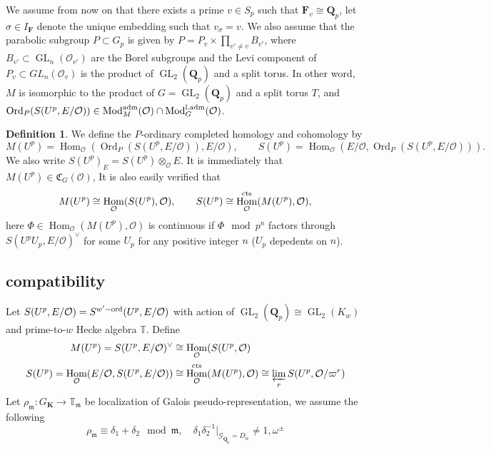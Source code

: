 \documentclass[leqno]{amsart}
\newcommand{\TT}{\mathbb{T}} %
\newcommand{\aMod}{\textnormal{Mod}^{\textnormal{adm}}}
\newcommand{\laMod}{\textnormal{Mod}^{\textnormal{l.adm}}}
\newcommand{\fC}{\mathfrak C}
\newcommand{\Gp}{\mathcal{G}_{\Qp}} %
\DeclareMathOperator{\Ord}{Ord}
\newcommand{\cts}{\textnormal{cts}}
\newcommand{\ord}{\textnormal{ord}}
\DeclareMathOperator{\GL}{GL}
\newcommand{\Q}{{\mathbf{Q}}}
\newcommand{\Qp}{\mathbf{Q}_p}
\newcommand{\F}{{\mathbf{F}}} %
\newcommand{\K}{{\mathbf{K}}} %
\newcommand{\oo}{\mathcal{O}} %
\newcommand{\fm}{\mathfrak{m}}
\DeclareMathOperator{\Hom}{Hom}
\theoremstyle{definition}
\newtheorem{defn}[thm]{Definition}
\theoremstyle{remark}
\begin{document}
We assume from now on that 
there exists a prime $v\in S_p$
such that  $\F_v\cong \Qp$,
let  $\sigma\in I_\F$
denote the unique embedding such that  $v_\sigma=v$.
We also assume that 
the parabolic subgroup $P\subset G_p$ is given by 
$P=P_v\times\prod_{v'\neq v}B_{v'}$,
where $B_{v'}\subset \GL_n(\oo_{v'})$
are the Borel subgroups
and the Levi component of $P_v\subset GL_n(\oo_v)$
is the product of $\GL_2(\Q_p)$ and a split torus.
In other word, $M$ is isomorphic to the product  
of  $G=\GL_2(\Qp)$ and a split torus  $T$,
and  $\Ord_P(S(U^p,E/\oo))\in \aMod_M(\oo)\cap \laMod_{G}(\oo)$.
\begin{defn}
	We define the $P$-ordinary completed homology and cohomology by
	\begin{equation*}
		M(U^p)=\Hom_\oo(\Ord_P(S(U^p,E/\oo)),E/\oo),\qquad
		S(U^p)=\Hom_\oo(E/\oo, \Ord_P(S(U^p,E/\oo))).
	\end{equation*}
	We also write $S(U^p)_E=S(U^p)\otimes_\oo E$.
	It is immediately that 
	$M(U^p)\in \fC_{G}(\oo)$,
	It is also easily verified that 
	\[
		M(U^p)\cong \Hom_\oo(S(U^p),\oo),\qquad
		S(U^p)\cong \Hom_\oo^{\cts}(M(U^p),\oo),
	\]
	here $\Phi\in \Hom_\oo(M(U^p),\oo)$ 
	is continuous if 
	$\Phi \mod p^n$ factors through
	$S(U^pU_p,E/\oo)^\vee$ for some $U_p$
	for any positive integer $n$
	($U_p$ depedents on  $n$).
\end{defn}


\subsection{compatibility}

Let $S(U^p,E/\oo)=S^{w'-\ord}(U^p,E/\oo)$
with action of $\GL_2(\Qp)\cong \GL_2(K_w)$
and prime-to-$w$ Hecke algebra $\TT$. 
Define
\begin{align*}
	M(U^p)=S(U^p,E/\oo)^{\vee}&\cong 
	\Hom_{\oo}(S(U^p,\oo)\\
	S(U^p)=\Hom_{\oo}(E/\oo,S(U^p,E/\oo))&\cong
	\Hom_{\oo}^{\cts}(M(U^p),\oo)\cong 
	\varprojlim_{r}S(U^p,\oo/\varpi^r)
\end{align*}
Let $\rho_\fm\colon G_\K\to \TT_\fm$
be localization of Galois pseudo-representation,
we assume the following 
\begin{equation}\tag{assump}\label{cond:gen}
	\rho_\fm\equiv \delta_1+\delta_2\mod \fm,\quad
	\delta_1\delta_2^{-1}\vert_{\Gp=D_w}
	\neq 1,\omega^{\pm}
\end{equation}
\end{document}
